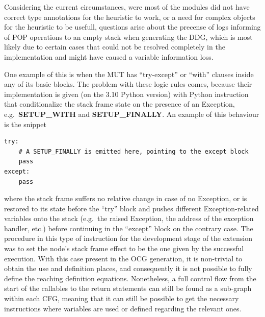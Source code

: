 \documentclass[%
  chapterprefix=false,%
  open=right,%
  twoside=true,%
  paper=a4,%
  logofile={Figures/logo.png},%
  thesistype=master,%
  UKenglish,%
]{se2thesis}
\begin{document}
Considering the current circumstances, were most of the modules did not have correct type annotations for the heuristic to work, or a need for complex objects for the heuristic to be usefull, questions arise about the precense of logs informing of POP operations to an empty stack when generating the DDG, which is most likely due to certain cases that could not be resolved completely in the implementation and might have caused a variable information loss.\@

One example of this is when the MUT has ``try-except'' or ``with'' clauses inside any of its basic blocks.
The problem with these logic rules comes, because their implementation is given (on the 3.10 Python version) with Python instruction that conditionalize the stack frame state on the presence of an Exception, e.g.~\textbf{SETUP\_WITH} and \textbf{SETUP\_FINALLY}.
An example of this behaviour is the snippet

\begin{verbatim}
try:
    # A SETUP_FINALLY is emitted here, pointing to the except block
    pass
except:
    pass
\end{verbatim}

where the stack frame suffers no relative change in case of no Exception, or is restored to its state before the ``try'' block and pushes different Exception-related variables onto the stack (e.g.~the raised Exception, the address of the exception handler, etc.) before continuing in the ``except'' block on the contrary case.  
The procedure in this type of instruction for the development stage of the extension was to set the node's stack frame effect to be the one given by the successful execution.
With this case present in the OCG generation, it is non-trivial to obtain the use and definition places, and consequently it is not possible to fully define the reaching definition equations.
Nonetheless, a full control flow from the start of the callables to the return statements can still be found as a sub-graph within each CFG, meaning that it can still be possible to get the necessary instructions where variables are used or defined regarding the relevant ones.
\end{document}
